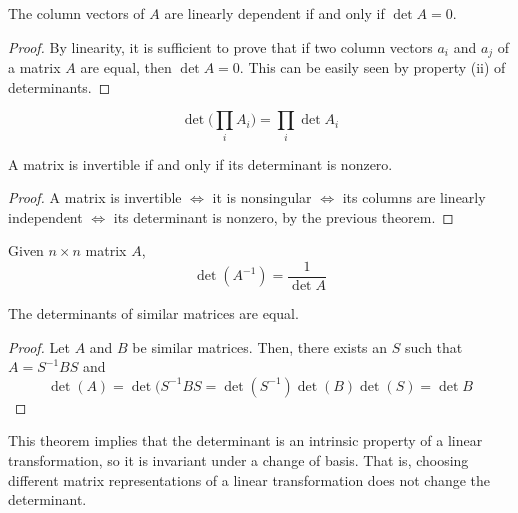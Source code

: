   \begin{theorem}
    The column vectors of $A$ are linearly dependent if and only if $\det{A} = 0$. 
  \end{theorem}
  \begin{proof}
    By linearity, it is sufficient to prove that if two column vectors $a_i$ and $a_j$ of a matrix $A$ are equal, then $\det{A} = 0$. This can be easily seen by property (ii) of determinants. 
  \end{proof}

  \begin{theorem}
    \begin{equation}
      \det{\bigg(\prod_i A_i \bigg)} = \prod_i \det{A_i}
    \end{equation}
  \end{theorem}

  \begin{theorem}
    A matrix is invertible if and only if its determinant is nonzero. 
  \end{theorem}
  \begin{proof}
    A matrix is invertible $\iff$ it is nonsingular $\iff$ its columns are linearly independent $\iff$ its determinant is nonzero, by the previous theorem. 
  \end{proof}

  \begin{corollary}
    Given $n \times n$ matrix $A$,
    \begin{equation}
      \det{(A^{-1})} = \frac{1}{\det{A}}
    \end{equation}
  \end{corollary}

  \begin{theorem}
    The determinants of similar matrices are equal. 
  \end{theorem}
  \begin{proof}
    Let $A$ and $B$ be similar matrices. Then, there exists an $S$ such that $A = S^{-1} B S$ and 
    \begin{equation}
      \det{(A)} = \det{(S^{-1} B S} = \det{(S^{-1})} \det{(B)} \det{(S)} = \det{B}
    \end{equation}
  \end{proof}

  This theorem implies that the determinant is an intrinsic property of a linear transformation, so it is invariant under a change of basis. That is, choosing different matrix representations of a linear transformation does not change the determinant.  

